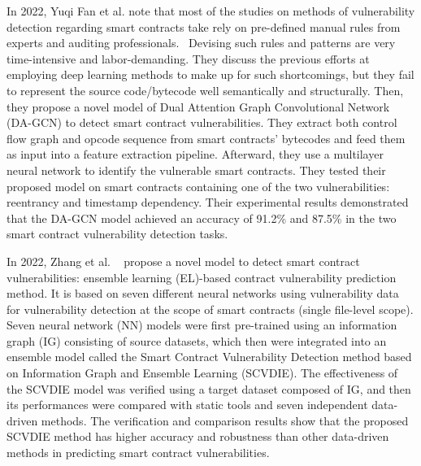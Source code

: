 In 2022, Yuqi Fan et al. note that most of the studies on methods of vulnerability detection regarding smart contracts take rely on pre-defined manual rules from experts and auditing professionals.~\cite{fan2021smart}
Devising such rules and patterns are very time-intensive and labor-demanding.
They discuss the previous efforts at employing deep learning methods to make up for such shortcomings, but they fail to represent the source code/bytecode well semantically and structurally.
Then, they propose a novel model of Dual Attention Graph Convolutional Network (DA-GCN) to detect smart contract vulnerabilities.
They extract both control flow graph and opcode sequence from smart contracts' bytecodes and feed them as input into a feature extraction pipeline. Afterward, they use a multilayer neural network to identify the vulnerable smart contracts.
They tested their proposed model on smart contracts containing one of the two vulnerabilities: reentrancy and timestamp dependency.
Their experimental results demonstrated that the DA-GCN model achieved an accuracy of 91.2\% and 87.5\% in the two smart contract vulnerability detection tasks.

In 2022, Zhang et al. ~\cite{zhang2022novel} propose a novel model to detect smart contract vulnerabilities: ensemble learning (EL)-based contract vulnerability prediction method.
It is based on seven different neural networks using vulnerability data for vulnerability detection at the scope of smart contracts (single file-level scope).
Seven neural network (NN) models were first pre-trained using an information graph (IG) consisting of source datasets, which then were
integrated into an ensemble model called the Smart Contract Vulnerability Detection method based on
Information Graph and Ensemble Learning (SCVDIE). The effectiveness of the SCVDIE model was
verified using a target dataset composed of IG, and then its performances were compared with static
tools and seven independent data-driven methods. The verification and comparison results show that
the proposed SCVDIE method has higher accuracy and robustness than other data-driven methods
in predicting smart contract vulnerabilities.

